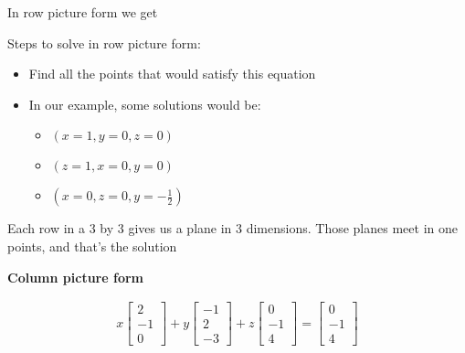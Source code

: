 \documentclass[12pt]{article}
\begin{document}
In row picture form we get

%     

Steps to solve in row picture form:
\begin{itemize}
    \item Find all the points that would satisfy this equation
    \item In our example, some solutions would be: 
    \begin{itemize}
        \item $ (x=1, y=0, z=0) $
        \item $ (z=1, x=0, y=0) $ 
        \item $ (x=0, z=0, y=-\frac{1}{2}) $
    \end{itemize}
\end{itemize}

Each row in a 3 by 3 gives us a plane in 3 dimensions. Those planes meet in one points, and that's the solution

\textbf{Column picture form}

\begin{align*}
    x \begin{bmatrix}
    2\\
    -1\\
    0
    \end{bmatrix}
    +
    y \begin{bmatrix}
    -1\\
    2\\
    -3
    \end{bmatrix}
    + z \begin{bmatrix}
    0\\
    -1\\
    4
    \end{bmatrix}
    = \begin{bmatrix}
    0\\
    -1\\
    4
    \end{bmatrix}
\end{align*}
\end{document}

